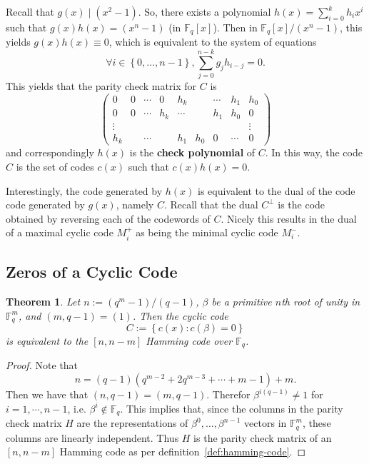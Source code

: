 \documentclass{article}
\newcommand{\F}{\mathbb{F}}
\newcommand{\dual}[1]{#1^\bot}
\renewcommand{\=}{\equiv}
\newcommand{\set}[1]{\left\{ #1 \right\}}
\theoremstyle{plain}
\newtheorem{thm}{Theorem}[subsection]
\theoremstyle{definition}
\begin{document}
Recall that $g(x) \mid (x^2 - 1)$.
So, there exists a polynomial $h(x) = \sum_{i=0}^k h_i x^i$ such that $g(x) h(x) = (x^n - 1)$ (in $\F_q[x]$).
Then in $\F_q[x]/(x^n-1)$, this yields $g(x) h(x) \= 0$,
which is equivalent to the system of equations
$$ \forall i \in \set{0, \dots, n-1}, \sum_{j=0}^{n-k} g_j h_{i-j} = 0. $$
This yields that the parity check matrix for $C$ is
$$ \begin{pmatrix}
0      & 0 & \cdots & 0   & h_k    &       & \cdots & h_1    & h_0 \\
0      & 0 & \cdots & h_k & \cdots &       & h_1    & h_0    & 0 \\
\vdots &   &        &     &        &       &        &        & \vdots \\
h_k    &   & \cdots &     & h_1    & h_0   & 0      & \cdots & 0
\end{pmatrix} $$
and correspondingly $h(x)$ is the \textbf{check polynomial} of $C$.
In this way, the code $C$ is the set of codes $c(x)$ such that $c(x)h(x) = 0$.

Interestingly, the code generated by $h(x)$ is equivalent to the dual of the code code generated by $g(x)$, namely $C$.
Recall that the dual $\dual C$ is the code obtained by reversing each of the codewords of $C$.
Nicely this results in the dual of a maximal cyclic code $M_i^+$ as being the minimal cyclic code $M_i^-$.

\subsection{Zeros of a Cyclic Code}

\begin{thm}
Let $n := (q^m - 1)/(q - 1)$, $\beta$ be a primitive $n$th root of unity in $\F_q^m$, and $(m, q-1) = (1)$.
Then the cyclic code
$$ C := \set{ c(x) : c(\beta) = 0 } $$
is equivalent to the $[n, n-m]$ Hamming code over $\F_q$.
\end{thm}
\begin{proof}
Note that
$$ n = (q-1) (q^{m-2} + 2q^{m-3} + \cdots + m - 1) + m. $$
Then we have that $(n, q-1) = (m, q-1)$.
Therefor $\beta^{i(q-1)} \neq 1$ for $i = 1, \cdots, n-1$, i.e. $\beta^i \not\in \F_q$.
This implies that, since the columns in the parity check matrix $H$ are the representations of $\beta^0, \dots, \beta^{n-1}$ vectors in $\F_q^m$, these columns are linearly independent.
Thus $H$ is the parity check matrix of an $[n, n-m]$ Hamming code as per definition~\ref{def:hamming-code}.
\end{proof}
\end{document}
